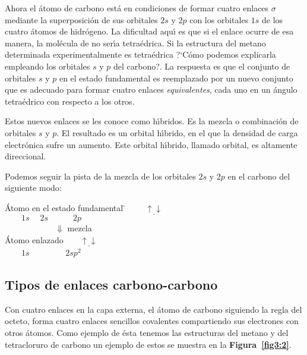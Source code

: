 Ahora el \'atomo de carbono est\'a en condiciones de formar cuatro enlaces $\sigma$ mediante la superposici\'on de sus orbitales $2s$ y $2p$ con los
orbitales $1s$ de los cuatro \'atomos de hidr\'ogeno. La dificultad aqu\'{\i} es que si el enlace ocurre de esa manera, la mol\'ecula de  no ser\'{\i}a
tetra\'edrica. Si la estructura del metano determinada experimentalmente es tetra\'edrica ?`C\'omo podemos explicarla empleando los orbitales $s$ y $p$ del
carbono?. La respuesta es que el conjunto de orbitales $s$ y $p$ en el estado fundamental es reemplazado por un nuevo conjunto que es adecuado para formar
cuatro enlaces \textit{equivalentes}, cada uno en un \'angulo tetra\'edrico con respecto a los otros.

Estos nuevos enlaces se les conoce como h\'{\i}bridos. Es la mezcla  o combinaci\'on de orbitales $s$ y $p$. El resultado es un orbital h\'{\i}brido, en el que la densidad de carga electr\'onica sufre un aumento. Este orbital h\'{\i}brido, llamado orbital, es altamente direccional.

Podemos seguir la pista de la mezcla de los orbitales $2s$  y $2p$ en el carbono del siguiente modo:

\begin{tabbing}
\'Atomo en el estado fundamental \= $\qquad\underline{\uparrow \downarrow}\quad 
$\fbox{$\underline{\uparrow\downarrow}\quad
\underbrace{\underline{\uparrow\:\;}
\quad \underline{\uparrow\:\; }\quad \underline{\;\:\;}}$} \\
\>$\qquad 1s \quad\; 2s\quad \quad\quad 2p$\\
\>$\qquad \qquad \qquad \Downarrow$ {\footnotesize mezcla}\\
\'Atomo enlazado\>$\qquad\underline{\uparrow \downarrow}\quad 
$\fbox{$\underline{\uparrow \:\;}\quad
\underline{\uparrow \:\;}
\quad \underline{\uparrow\:\; }\quad \underline{\uparrow\:\;} $}\\
\>$\qquad 1s$  $\qquad \quad\quad 2sp^2$\\
\end{tabbing}
     
\subsection{Tipos de enlaces car\-bo\-no-car\-bono}
Con cuatro enlaces en la capa externa, el \'atomo de carbono siguiendo la regla del
octeto, forma cuatro enlaces sencillos covalentes compartiendo sus electrones con otros
\'atomos. Como ejemplo de \'esta tenemos las estruc\-turas del metano y del tetracloruro
de carbono un ejemplo de estos se muestra en la \textbf{Figura~\ref{fig3:2}}.

